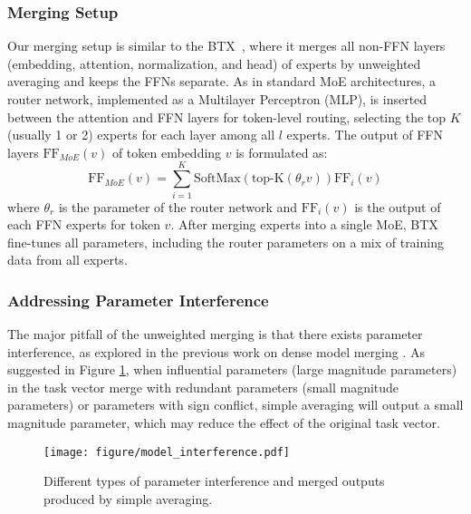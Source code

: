 \subsubsection{Merging Setup}
\label{ss:standard-merging-btx}

Our merging setup is similar to the BTX~\cite{sukhbaatar2024branchtrainmixmixingexpertllms}, where it merges all non-FFN layers (embedding, attention, normalization, and head) of experts by unweighted averaging and keeps the FFNs separate.
As in standard MoE architectures, a router network, implemented as a Multilayer Perceptron (MLP), is inserted between the attention and FFN layers for token-level routing, selecting the top $K$ (usually 1 or 2) experts for each layer among all $l$ experts. The output of FFN layers $\text{FF}_{MoE}(v)$ of token embedding $v$ is formulated as:
\begin{equation*}
    \text{FF}_{MoE}(v) = \sum_{i=1}^K \text{SoftMax}(\text{top-K}(\theta_r v))\text{FF}_i(v)
\end{equation*}
where $\theta_r$ is the parameter of the router network and $\text{FF}_{i}(v)$ is the output of each FFN experts for token $v$.
After merging experts into a single MoE, BTX fine-tunes all parameters, including the router parameters on a mix of training data from all experts.

\subsubsection{Addressing Parameter Interference}
\label{ss:replacing-average-merging}
The major pitfall of the unweighted merging is that there exists parameter interference, as explored in the previous work on dense model merging \cite{yu2024language, yadav2024ties}. As suggested in Figure \ref{fig:model_interference}, when influential parameters (large magnitude parameters) in the task vector merge with redundant parameters (small magnitude parameters) or parameters with sign conflict, simple averaging will output a small magnitude parameter, which may reduce the effect of the original task vector.

\begin{figure}[!htb]
     \centering
     \texttt{[image: figure/model\_interference.pdf]}
     \caption{Different types of parameter interference and merged outputs produced by simple averaging.}
     \label{fig:model_interference}
\end{figure}

